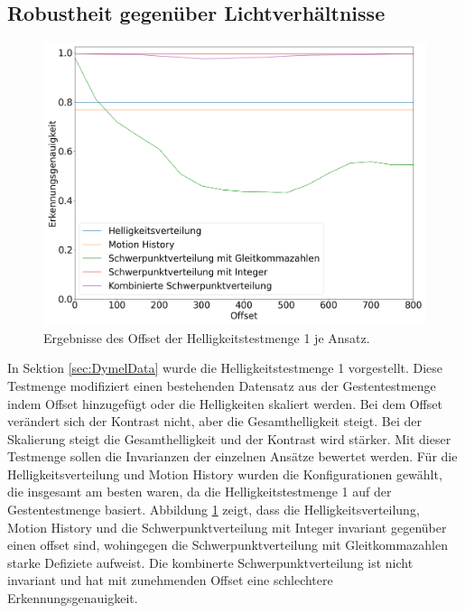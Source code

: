 \subsection{Robustheit gegenüber Lichtverhältnisse}
\label{sec:brightness_eval}
\begin{figure}[h!]
    \centering
    \includegraphics[width=\linewidth]{images/brightness_offset.png}
    \caption{Ergebnisse des Offset der Helligkeitstestmenge 1 je Ansatz.}
    \label{fig:brightness_offset}
\end{figure}
In Sektion \ref{sec:DymelData} wurde die Helligkeitstestmenge 1 vorgestellt. Diese Testmenge modifiziert einen bestehenden Datensatz aus der Gestentestmenge indem Offset hinzugefügt
oder die Helligkeiten skaliert werden. Bei dem Offset verändert sich der Kontrast nicht, aber die Gesamthelligkeit steigt. Bei der Skalierung steigt die Gesamthelligkeit und der Kontrast wird stärker. Mit
dieser Testmenge sollen die Invarianzen der einzelnen Ansätze bewertet werden. Für die Helligkeitsverteilung und Motion History wurden die Konfigurationen gewählt, die insgesamt am besten waren, da die
Helligkeitstestmenge 1 auf der Gestentestmenge basiert.
\newline
\newline
Abbildung \ref{fig:brightness_offset} zeigt, dass die Helligkeitsverteilung, Motion History und die Schwerpunktverteilung
mit Integer invariant gegenüber einen offset sind, wohingegen die Schwerpunktverteilung mit Gleitkommazahlen starke Defiziete aufweist.
Die kombinerte Schwerpunktverteilung ist nicht invariant und hat mit zunehmenden Offset eine schlechtere Erkennungsgenauigkeit.
